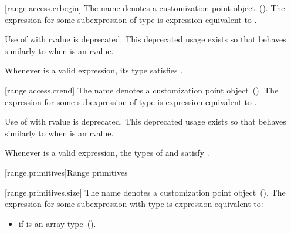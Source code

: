 {[range.access.crbegin]{}
\pnum
The name  denotes a customization point
object~(). The expression
 for some subexpression  of type 
is expression-equivalent to .

\pnum
Use of  with rvalue  is deprecated.
\enternote This deprecated usage exists so that 
behaves similarly to   when
 is an rvalue. \exitnote

\pnum
\enternote Whenever  is a valid expression, its
type satisfies . \exitnote

[range.access.crend]{}
\pnum
The name  denotes a customization point
object~(). The expression
 for some subexpression  of type 
is expression-equivalent to .

\pnum
Use of  with rvalue  is deprecated.
\enternote This deprecated usage exists so that 
behaves similarly to   when
 is an rvalue. \exitnote

\pnum
\enternote Whenever  is a valid expression, the
types of  and  satisfy
. \exitnote

[range.primitives]{Range primitives}

\pnum
{}

[range.primitives.size]{}
\pnum
The name  denotes a customization point
object~(). The expression
 for some subexpression  with type
 is expression-equivalent to:

\begin{itemize}
\item
   if  is an array
  type~().


\end{itemize}}
